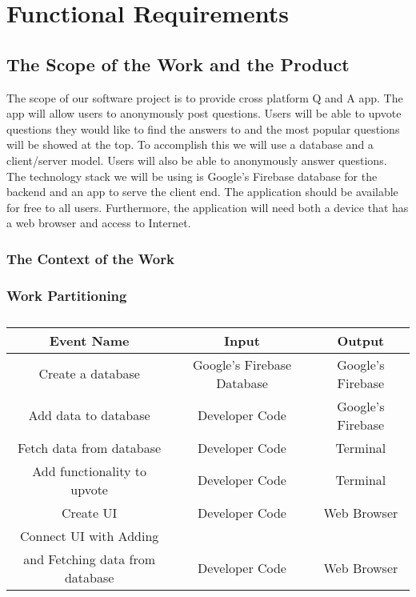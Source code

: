 \documentclass[12pt, titlepage]{article}
\begin{document}
\section{Functional Requirements}

\subsection{The Scope of the Work and the Product}

The scope of our software project is to provide cross platform Q and A app. The app will allow users to anonymously post questions. Users will be able to upvote questions they would like to find the answers to and the most popular questions will be showed at the top. To accomplish this we will use a database and a client/server model. Users will also be able to anonymously answer questions. The technology stack we will be using is Google’s Firebase database for the backend and an app to serve the client end. The application should be available for free to all users. Furthermore, the application will need both a device that has a web browser and access to Internet. 

\subsubsection{The Context of the Work}

\subsubsection{Work Partitioning}

\begin{table}[h!]
\centering
\begin{tabular}{|c|c|c|} \hline
 \textbf{Event  Name} & \textbf{Input} &  \textbf{Output} \\ \hline
 Create a database & Google’s Firebase Database & Google’s Firebase  \\\hline
 Add data to database & Developer Code & Google’s Firebase \\\hline
 Fetch data from database & Developer Code & Terminal  \\\hline
 Add functionality to upvote & Developer Code & Terminal  \\\hline
 Create UI & Developer Code & Web Browser  \\\hline
 Connect UI with Adding  & & \\
 and Fetching data from database & Developer Code & Web Browser\\\hline
\end{tabular}
\caption{}
\label{TeamMemberRoles}
\end{table}
\end{document}
